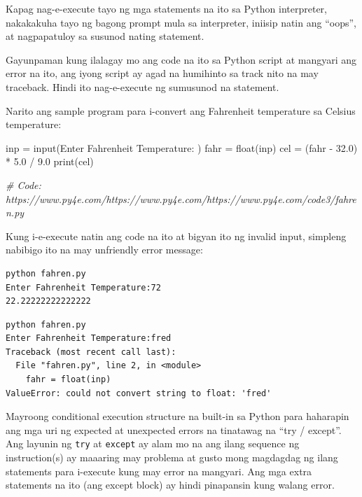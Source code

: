 \documentclass[10pt,]{book}
\newenvironment{Shaded}{}{}
\newcommand{\BuiltInTok}[1]{\textcolor[rgb]{0.00,0.50,0.00}{#1}}
\newcommand{\CommentTok}[1]{\textcolor[rgb]{0.38,0.63,0.69}{\textit{#1}}}
\newcommand{\FloatTok}[1]{\textcolor[rgb]{0.25,0.63,0.44}{#1}}
\newcommand{\NormalTok}[1]{#1}
\newcommand{\OperatorTok}[1]{\textcolor[rgb]{0.40,0.40,0.40}{#1}}
\newcommand{\StringTok}[1]{\textcolor[rgb]{0.25,0.44,0.63}{#1}}
\begin{document}
Kapag nag-e-execute tayo ng mga statements na ito sa Python interpreter,
nakakakuha tayo ng bagong prompt mula sa interpreter, iniisip natin ang
``oops'', at nagpapatuloy sa susunod nating statement.

Gayunpaman kung ilalagay mo ang code na ito sa Python script at mangyari
ang error na ito, ang iyong script ay agad na humihinto sa track nito na
may traceback. Hindi ito nag-e-execute ng sumusunod na statement.


Narito ang sample program para i-convert ang Fahrenheit temperature sa
Celsius temperature:

  

\begin{Shaded}
\begin{Highlighting}[]
\NormalTok{inp }\OperatorTok{=} \BuiltInTok{input}\NormalTok{(}\StringTok{\textquotesingle{}Enter Fahrenheit Temperature: \textquotesingle{}}\NormalTok{)}
\NormalTok{fahr }\OperatorTok{=} \BuiltInTok{float}\NormalTok{(inp)}
\NormalTok{cel }\OperatorTok{=}\NormalTok{ (fahr }\OperatorTok{{-}} \FloatTok{32.0}\NormalTok{) }\OperatorTok{*} \FloatTok{5.0} \OperatorTok{/} \FloatTok{9.0}
\BuiltInTok{print}\NormalTok{(cel)}

\CommentTok{\# Code: https://www.py4e.com/https://www.py4e.com/https://www.py4e.com/code3/fahren.py}
\end{Highlighting}
\end{Shaded}

Kung i-e-execute natin ang code na ito at bigyan ito ng invalid input,
simpleng nabibigo ito na may unfriendly error message:

{\small
\begin{verbatim}
python fahren.py
Enter Fahrenheit Temperature:72
22.22222222222222
\end{verbatim}
}

{\small
\begin{verbatim}
python fahren.py
Enter Fahrenheit Temperature:fred
Traceback (most recent call last):
  File "fahren.py", line 2, in <module>
    fahr = float(inp)
ValueError: could not convert string to float: 'fred'
\end{verbatim}
}

Mayroong conditional execution structure na built-in sa Python para
haharapin ang mga uri ng expected at unexpected errors na tinatawag na
``try / except''. Ang layunin ng \texttt{try} at \texttt{except} ay alam
mo na ang ilang sequence ng instruction(s) ay maaaring may problema at
gusto mong magdagdag ng ilang statements para i-execute kung may error
na mangyari. Ang mga extra statements na ito (ang except block) ay hindi
pinapansin kung walang error.
\end{document}
